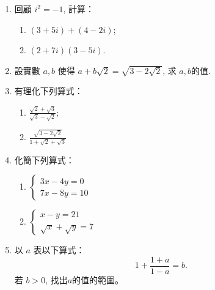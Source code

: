 \documentclass[12pt]{article}
\begin{document}
    \begin{enumerate}
        \item 回顧 $i^2 = -1$, 計算：\begin{enumerate}
            \item $(3+5i)+(4-2i)$;
            \item $(2+7i)(3-5i)$.
        \end{enumerate}
        \item 設實數 $a,b$ 使得 $a+b\sqrt{2}=\sqrt{3-2\sqrt{2}}$, 求 $a,b$的值.
        \item 有理化下列算式：\begin{enumerate}
            \item $\frac{\sqrt{2}+\sqrt{3}}{\sqrt{3}-\sqrt{2}}$;
            \item $\frac{\sqrt{3-2\sqrt{2}}}{1+\sqrt{2}+\sqrt{3}}$
        \end{enumerate}
        \item 化簡下列算式： \begin{enumerate}
            \item $\begin{cases}
                3x-4y=0\\
                7x-8y=10
            \end{cases}$
            \item $\begin{cases}
                x-y=21\\
                \sqrt{x}+\sqrt{y}=7
            \end{cases}$
        \end{enumerate}
        \item 以 $a$ 表以下算式： $$1+\frac{1+a}{1-a}=b.$$ 若 $b>0$, 找出$a$的值的範圍。
    \end{enumerate}
\end{document}
